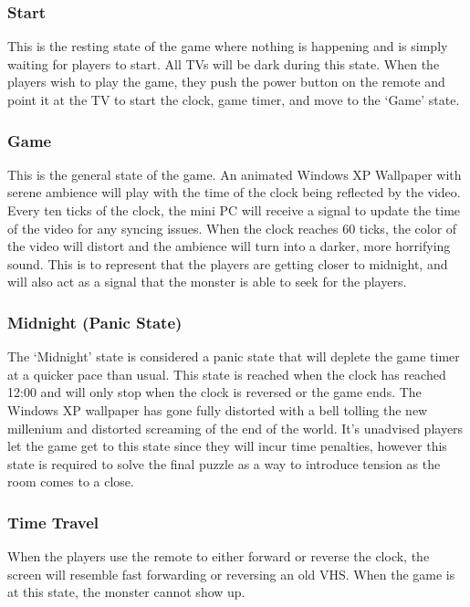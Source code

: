 \documentclass[conference]{IEEEtran}
\begin{document}
\subsubsection{Start}

\indent This is the resting state of the game where nothing is happening and is simply waiting for players to start. All TVs will be dark during this state.
When the players wish to play the game, they push the power button on the remote and point it at the TV to start the clock, game timer, and move to the `Game' state.

\subsubsection{Game}

\indent This is the general state of the game. An animated Windows XP Wallpaper with serene ambience will play with the time of the clock being reflected by the video.
Every ten ticks of the clock, the mini PC will receive a signal to update the time of the video for any syncing issues. When the clock reaches 60 ticks,
the color of the video will distort and the ambience will turn into a darker, more horrifying sound. This is to represent that the players are getting
closer to midnight, and will also act as a signal that the monster is able to seek for the players.

\subsubsection{Midnight (Panic State)}

\indent The `Midnight' state is considered a panic state that will deplete the game timer at a quicker pace than usual. This state is reached when
the clock has reached 12:00 and will only stop when the clock is reversed or the game ends. The Windows XP wallpaper has gone fully distorted with
a bell tolling the new millenium and distorted screaming of the end of the world. It's unadvised players let the game get to this state
since they will incur time penalties, however this state is required to solve the final puzzle as a way to introduce tension as the room comes to a close.

\subsubsection{Time Travel}

\indent When the players use the remote to either forward or reverse the clock, the screen will resemble fast forwarding or reversing an old VHS. When
the game is at this state, the monster cannot show up.
\end{document}

